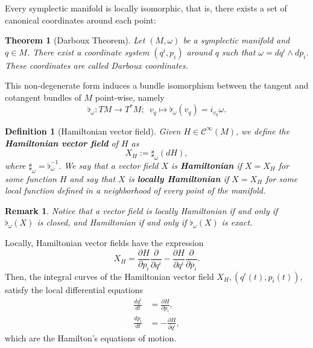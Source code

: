 \documentclass[12pt]{article}
\newtheorem{theorem}{Theorem}[section]
\newtheorem{Def}{Definition}[section]
\newtheorem{remark}{Remark}[section]
\newcommand{\partder}[2]{\frac{\partial #1}{\partial #2}}
\newcommand{\totder}[2]{\frac{d #1}{d #2}}
\begin{document}
Every symplectic manifold is locally isomorphic, that is, there exists a set of canonical coordinates around each point:\\

\begin{theorem}[Darboux Theorem] \label{DarbouxTheorem}Let $(M, \omega)$ be a symplectic manifold and $q \in M$. There exist a coordinate system $(q^i,p_i)$ around $q$ such that $\omega = dq^i \wedge dp_ i$. These coordinates are called Darboux coordinates.
\end{theorem}

This non-degenerate form induces a bundle isomorphism between the tangent and cotangent bundles of $M$ point-wise, namely \begin{equation*} \flat_\omega: TM \rightarrow T^*M; \,\,\, v_q \mapsto \flat_\omega(v_q) = i_{v_q} \omega. \end{equation*} 
\begin{Def}[Hamiltonian vector field] Given $H \in \mathcal{C}^\infty(M)$, we define the \textbf{Hamiltonian vector field} of $H$ as $$X_H:= \sharp_\omega(dH),$$ where $\sharp_\omega = \flat_\omega^{-1}.$ We say that a vector field $X$ is \textbf{Hamiltonian} if $X = X_H$ for some function $H$ and say that $X$ is \textbf{locally Hamiltonian} if $X = X_H$ for some local function defined in a neighborhood of every point of the manifold.\\
\end{Def}

\begin{remark}{\rm
    Notice that a vector field is locally Hamiltonian if and only if $\flat_\omega(X)$ is closed, and Hamiltonian if and only if $\flat_\omega(X)$ is exact.}
\end{remark}

Locally, Hamiltonian vector fields have the expression $$X_H = \partder{H}{p_i} \partder{}{q^i} - \partder{H}{q^i} \partder{}{p_i}.$$
Then, the integral curves of the Hamiltonian vector field $X_H, (q^i(t), p_i(t))$, satisfy the local differential equations
\begin{align*}
    \totder{q^i}{t} &= \partder{H}{p_i},\\
    \totder{p_i}{t} &= - \partder{H}{q^i},
\end{align*}
which are the Hamilton's equations of motion.
\end{document}
